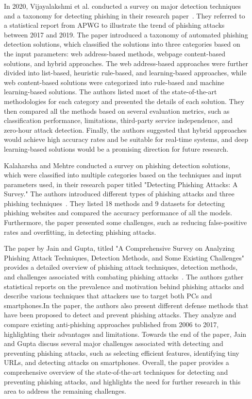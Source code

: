 \documentclass[final]{cvpr}
\begin{document}
In 2020, Vijayalakshmi et al. conducted a survey on major detection techniques and a taxonomy for detecting phishing in their research paper~\cite{vijayalakshmi2020web}. They referred to a statistical report from APWG to illustrate the trend of phishing attacks between 2017 and 2019. The paper introduced a taxonomy of automated phishing detection solutions, which classified the solutions into three categories based on the input parameters: web address-based methods, webpage content-based solutions, and hybrid approaches. The web address-based approaches were further divided into list-based, heuristic rule-based, and learning-based approaches, while web content-based solutions were categorized into rule-based and machine learning-based solutions. The authors listed most of the state-of-the-art methodologies for each category and presented the details of each solution. They then compared all the methods based on several evaluation metrics, such as classification performance, limitations, third-party service independence, and zero-hour attack detection. Finally, the authors suggested that hybrid approaches would achieve high accuracy rates and be suitable for real-time systems, and deep learning-based solutions would be a promising direction for future research.


Kalaharsha and Mehtre conducted a survey on phishing detection solutions, which were classified into multiple categories based on the techniques and input parameters used, in their research paper titled "Detecting Phishing Attacks: A Survey." The authors introduced different types of phishing attacks and three phishing techniques~\cite{kalaharsha2021detecting}. They listed 18 methods and 9 datasets for detecting phishing websites and compared the accuracy performance of all the models. Furthermore, the paper presented some challenges, such as reducing false-positive rates and overfitting, in detecting phishing attacks.


The paper by Jain and Gupta, titled "A Comprehensive Survey on Analyzing Phishing Attack Techniques, Detection Methods, and Some Existing Challenges" provides a detailed overview of phishing attack techniques, detection methods, and challenges associated with combating phishing attacks~\cite{jain2021survey}. The authors gather statistical reports on the prevalence and motivation behind phishing attacks and describe various techniques that attackers use to target both PCs and smartphones.In the paper, the authors also present different defense methods that have been proposed to detect and prevent phishing attacks. They analyze and compare existing anti-phishing approaches published from 2006 to 2017, highlighting their advantages and limitations.
Towards the end of the paper, Jain and Gupta discuss several major challenges associated with detecting and preventing phishing attacks, such as selecting efficient features, identifying tiny URLs, and detecting attacks on smartphones. Overall, the paper provides a comprehensive overview of the state-of-the-art techniques for detecting and preventing phishing attacks, and highlights the need for further research in this area to address the remaining challenges.
\end{document}
